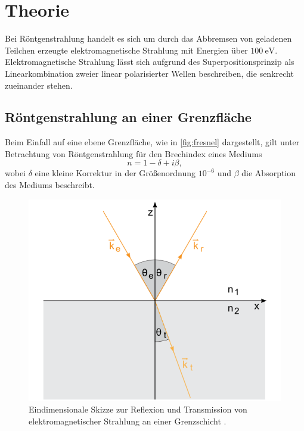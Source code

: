 \section{Theorie}
Bei Röntgenstrahlung handelt es sich um durch das Abbremsen von geladenen Teilchen erzeugte elektromagnetische Strahlung mit Energien über $\SI{100}{\electronvolt}$. Elektromagnetische Strahlung lässt sich aufgrund des Superpositionsprinzip als Linearkombination zweier linear polarisierter Wellen beschreiben, die senkrecht zueinander stehen.

\subsection{Röntgenstrahlung an einer Grenzfläche}
Beim Einfall auf eine ebene Grenzfläche, wie in \autoref{fig:fresnel} dargestellt, gilt unter Betrachtung von Röntgenstrahlung für den Brechindex eines Mediums
\begin{equation*}
  n = 1 - \delta + i \beta,
\end{equation*}
wobei $\delta$ eine kleine Korrektur in der Größenordnung $10^{-6}$ und $\beta$ die Absorption des Mediums beschreibt.

\begin{figure}[H]
  \centering
  \includegraphics{fresnel.png}
  \caption{Eindimensionale Skizze zur Reflexion und Transmission von elektromagnetischer Strahlung an einer Grenzschicht \cite{fresnel}.}
  \label{fig:fresnel}
\end{figure}

